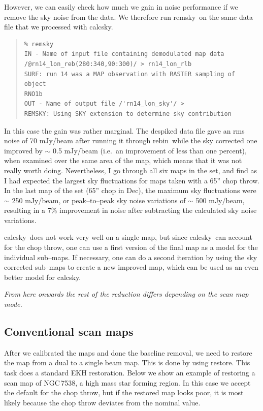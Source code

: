 \documentclass[twoside,11pt]{article}
\newenvironment{myquote}{\begin{quote}\begin{small}}{\end{small}\end{quote}}
\newcommand{\task}[1]{\textsf{#1}}
\newcommand{\rebin}{\xref{\task{rebin}}{sun216}{REBIN}}
\newcommand{\calcsky}{\xref{\task{calcsky}}{sun216}{CALCSKY}}
\newcommand{\remsky}{\xref{\task{remsky}}{sun216}{REMSKY}}
\newcommand{\restore}{\xref{\task{restore}}{sun216}{RESTORE}}
\newcommand{\xref}[3]{#1}
\newcommand{\xlabel}[1]{}
\renewcommand{\_}{\texttt{\symbol{95}}}
\begin{document}
However, we can easily check how much we gain in noise performance if
we remove the sky noise from the data.  We therefore run \remsky\ on
the same data file that we processed with \calcsky.

\begin{myquote}
\begin{verbatim}
% remsky
IN - Name of input file containing demodulated map data
/@rn14_lon_reb(280:340,90:300)/ > rn14_lon_rlb
SURF: run 14 was a MAP observation with RASTER sampling of object
RNO1b
OUT - Name of output file /'rn14_lon_sky'/ >
REMSKY: Using SKY extension to determine sky contribution
\end{verbatim}
\end{myquote}

In this case the gain was rather marginal. The despiked data file gave
an rms noise of 70 mJy/beam after running it through \rebin\, while the
sky corrected one improved by $\sim$ 0.5 mJy/beam (i.e.\ an improvement
of less than one percent), when examined over the same area of the map,
which means that it was not really worth doing. Nevertheless, I go
through all six maps in the set, and find as I had expected the largest
sky fluctuations for maps taken with a 65'' chop throw. In the last map
of the set (65'' chop in Dec), the maximum sky fluctuations were $\sim$
250 mJy/beam, or  peak--to--peak sky noise variations of $\sim$ 500
mJy/beam, resulting in a 7\% improvement in noise after subtracting the
calculated sky noise variations.

\calcsky\ does not work very well on a single map, but since \calcsky\
can account for the chop throw, one can use a first version of the
final map as a model for the individual sub--maps.  If necessary, one
can do a second iteration by using the sky corrected sub--maps to
create a new improved map, which can be used as an even better model
for \calcsky.

{\it From here onwards the rest of the reduction differs depending on
the scan map mode.}

\subsection{\xlabel{Conventional_scan_maps}Conventional scan maps}

After we calibrated the maps and done the baseline removal, we need to
restore the map from a dual to a single beam map.  This is done by
using \restore.  This task does a standard EKH restoration.  Below we
show an example of restoring a scan map of NGC\,7538, a high mass star
forming region.  In this case we accept the default for the chop
throw, but if the restored map looks poor, it is most likely because
the chop throw deviates from the nominal value.
\end{document}
